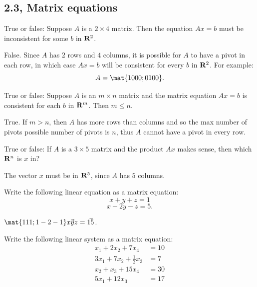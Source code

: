 \newpage

\subsection{2.3, Matrix equations}
\begin{problems} 
\problem %
True or false: Suppose $A$ is a $2 \times 4$ matrix.  Then the equation
  $Ax = b$ must be inconsistent for some $b$ in ${\bf R}^2$.
 
\begin{solution}
False.  Since $A$ has $2$ rows and $4$ columns, it is possible for $A$ to 
have a pivot in each row, in which case $Ax=b$ will be consistent for 
every $b$ in ${\bf R}^2$.  For example:    
\[A = \mat{1 0 0 0; 0 1 0 0}.\]
\end{solution}

\problem %
True or false: Suppose $A$ is an $m \times n$ matrix and the matrix 
equation $Ax = b$ is consistent for each $b$ in ${\bf R}^m$. 
Then $m \leq n$.
 
\begin{solution}
True.  If $m > n$, then $A$ has more rows than columns
    and so the max number of pivots possible number of pivots is $n$,
    thus $A$ cannot have a pivot in every row. 
\end{solution}

\problem %
True or false: If $A$ is a $3 \times 5$ matrix and the product $Ax$ makes sense, then which ${\bf R}^n$ is $x$ in?

\begin{solution}
The vector $x$ must be in ${\bf R}^5$, since $A$ has $5$ columns.
\end{solution}

\problem %
 Write the following linear equation as a matrix equation:
  \[x + y + z = 1\]
  \[x - 2y - z = 5.\]

\begin{solution}
$\mat{1 1 1; 1 -2 -1} \vec{x y z} = \vec{1 5}$.
\end{solution}

\problem
Write the following linear system as a matrix equation:
    \begin{align*}
        x_1   + 2x_2 + 7x_4                      &= 10 \\
        3x_1  + 7x_2 + \tfrac{1}{2}x_3           &= 7  \\
        x_2  + x_3 + 15x_4                       &= 30 \\
        5x_1  +  12x_3                           &= 17
    \end{align*}


\end{problems}
